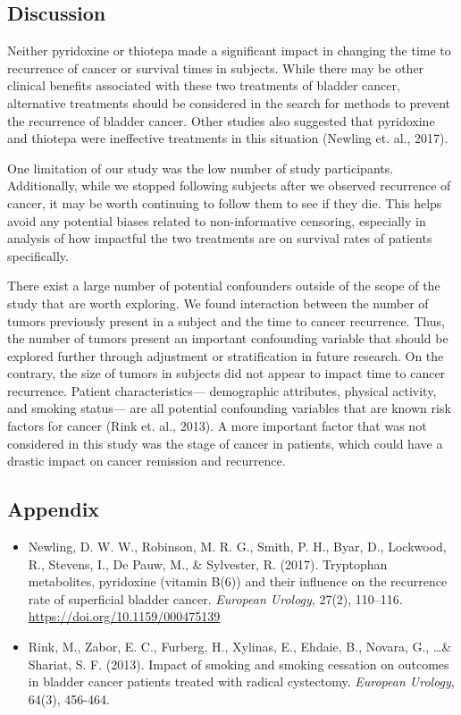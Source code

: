 \documentclass{article}
\begin{document}
	\subsection*{Discussion}
	Neither pyridoxine or thiotepa made a significant impact in changing the time to recurrence of cancer or survival times in subjects. While there may be other clinical benefits associated with these two treatments of bladder cancer, alternative treatments should be considered in the search for methods to prevent the recurrence of bladder cancer. Other studies also suggested that pyridoxine and thiotepa were ineffective treatments in this situation (Newling et. al., 2017). 

	One limitation of our study was the low number of study participants. Additionally, while we stopped following subjects after we observed recurrence of cancer, it may be worth continuing to follow them to see if they die. This helps avoid any potential biases related to non-informative censoring, especially in analysis of how impactful the two treatments are on survival rates of patients specifically.

	There exist a large number of potential confounders outside of the scope of the study that are worth exploring. We found interaction between the number of tumors previously present in a subject and the time to cancer recurrence. Thus, the number of tumors present an important confounding variable that should be explored further through adjustment or stratification in future research. On the contrary, the size of tumors in subjects did not appear to impact time to cancer recurrence. Patient characteristics— demographic attributes, physical activity, and smoking status— are all potential confounding variables that are known risk factors for cancer (Rink et. al., 2013). A more important factor that was not considered in this study was the stage of cancer in patients, which could have a drastic impact on cancer remission and recurrence.

	\newpage
	\subsection*{Appendix}
	\begin{itemize}
		\item Newling, D. W. W., Robinson, M. R. G., Smith, P. H., Byar, D., Lockwood, R., Stevens, I., De Pauw, M., \& Sylvester, R. (2017). Tryptophan metabolites, pyridoxine (vitamin B(6)) and their influence on the recurrence rate of superficial bladder cancer. \textit{European Urology}, 27(2), 110–116. \url{https://doi.org/10.1159/000475139}
		
		\item Rink, M., Zabor, E. C., Furberg, H., Xylinas, E., Ehdaie, B., Novara, G., \ldots \& Shariat, S. F. (2013). Impact of smoking and smoking cessation on outcomes in bladder cancer patients treated with radical cystectomy. \textit{European Urology}, 64(3), 456-464.
	\end{itemize}
\end{document}
